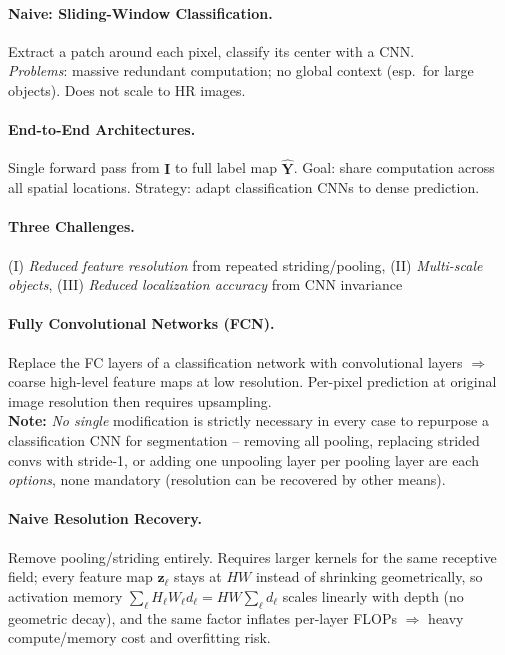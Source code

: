\documentclass{article}
\begin{document}
\paragraph{Naive: Sliding-Window Classification.}
Extract a patch around each pixel, classify its center with a CNN. \\
\textit{Problems}: massive redundant computation; no global context (esp.\ for large objects). Does not scale to HR images.

\paragraph{End-to-End Architectures.}
Single forward pass from $\mathbf{I}$ to full label map $\hat{\mathbf{Y}}$. Goal: share computation across all spatial locations. Strategy: adapt classification CNNs to dense prediction.

\paragraph{Three Challenges.} (I) \textit{Reduced feature resolution} from repeated striding/pooling, (II) \textit{Multi-scale objects}, (III) \textit{Reduced localization accuracy} from CNN invariance

\paragraph{Fully Convolutional Networks (FCN).}
Replace the FC layers of a classification network with convolutional layers $\Rightarrow$ coarse high-level feature maps at low resolution. Per-pixel prediction at original image resolution then requires upsampling.\\
\textbf{Note:} \textit{No single} modification is strictly necessary in every case to repurpose a classification CNN for segmentation -- removing all pooling, replacing strided convs with stride-1, or adding one unpooling layer per pooling layer are each \textit{options}, none mandatory (resolution can be recovered by other means).

\paragraph{Naive Resolution Recovery.}
Remove pooling/striding entirely. Requires larger kernels for the same receptive field; every feature map $\mathbf{z}_\ell$ stays at $HW$ instead of shrinking geometrically, so activation memory $\sum_\ell H_\ell W_\ell d_\ell = HW \sum_\ell d_\ell$ scales linearly with depth (no geometric decay), and the same factor inflates per-layer FLOPs $\Rightarrow$ heavy compute/memory cost and overfitting risk.
\end{document}
